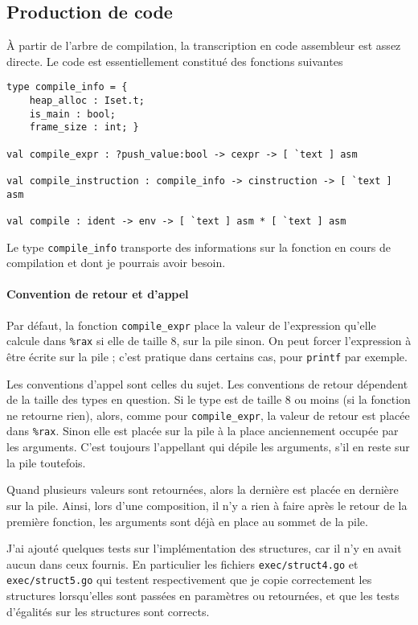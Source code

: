 \documentclass[11pt]{article}
\begin{document}
\subsection{Production de code}

À partir de l'arbre de compilation, la transcription en code assembleur est assez directe. Le code est essentiellement constitué des fonctions suivantes

\begin{verbatim}
type compile_info = {
    heap_alloc : Iset.t;
    is_main : bool;
    frame_size : int; }

val compile_expr : ?push_value:bool -> cexpr -> [ `text ] asm

val compile_instruction : compile_info -> cinstruction -> [ `text ] asm

val compile : ident -> env -> [ `text ] asm * [ `text ] asm
\end{verbatim}

Le type \texttt{compile\_info} transporte des informations sur la fonction en cours de compilation et dont je pourrais avoir besoin.

\paragraph{Convention de retour et d'appel} Par défaut, la fonction \texttt{compile\_expr} place la valeur de l'expression qu'elle calcule dans \texttt{\%rax} si elle de taille 8, sur la pile sinon. On peut forcer l'expression à être écrite sur la pile ; c'est pratique dans certains cas, pour \texttt{printf} par exemple.

Les conventions d'appel sont celles du sujet. Les conventions de retour dépendent de la taille des types en question. Si le type est de taille 8 ou moins (si la fonction ne retourne rien), alors, comme pour \texttt{compile\_expr}, la valeur de retour est placée dans \texttt{\%rax}. Sinon elle est placée sur la pile à la place anciennement occupée par les arguments. C'est toujours l'appellant qui dépile les arguments, s'il en reste sur la pile toutefois.

Quand plusieurs valeurs sont retournées, alors la dernière est placée en dernière sur la pile. Ainsi, lors d'une composition, il n'y a rien à faire après le retour de la première fonction, les arguments sont déjà en place au sommet de la pile.

J'ai ajouté quelques tests sur l'implémentation des structures, car il n'y en avait aucun dans ceux fournis. En particulier les fichiers \texttt{exec/struct4.go} et \texttt{exec/struct5.go} qui testent respectivement que je copie correctement les structures lorsqu'elles sont passées en paramètres ou retournées, et que les tests d'égalités sur les structures sont corrects.
\end{document}
